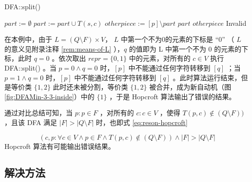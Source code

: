 \begin{algorithm}
    \caption{ DFA::split() }\label{al:split}
    \begin{algorithmic}[1]
         
            \Statex {}
            \State $part := \emptyset$ 
             
                    \State $part := part \cup T(s,c)$
                \EndIf
            \EndFor
                \State $otherpiece := [p] \setminus part$
                     {$part$}
                \Else
                     {$otherpiece$}
                \EndIf
            \Else
                 {Invalid}
            \EndIf
        \EndFunction
    \end{algorithmic}
\end{algorithm}

在本例中，由于 $L=(Q \setminus F) \times V$， $L$ 中第一个不为0的元素的下标是 “0” （ $L$ 的意义见附录注释 \ref{rem:means-of-L} ），$q$ 的值即为 L 中第一个不为 0 的元素的下标，此时 $q = 0$ 。依次取出 $repr = \{ 0,1 \}$ 中的元素，对所有的 $c \in V$ 执行 DFA::split() 。当 $p=0 \land q=0 $ 时，$[p]$ 中不能通过任何字符转移到 $[q]$ ；当 $p=1 \land q=0 $ 时，$[p]$ 中不能通过任何字符转移到 $[q]$ 。此时算法运行结束，但是等价类 $\{1,2 \}$ 此时还未被分割，等价类 $\{1,2 \}$ 被合并，成为新自动机（图 \ref{fig:DFAMin-3-3-inside}）中的 $\{ 1\}$ ，于是 Hopcroft 算法输出了错误的结果。

通过对比总结可知，当 $p:p \in F$ ，对所有的 $c:c\in V$ ，使得 $ T(p,c) \notin (Q\setminus F) ) $，且该 DFA 满足 $|F| > |Q \setminus F| $ 时，也即式 \ref{eq:reson-hopcroft}

\begin{equation}\label{eq:reson-hopcroft} 
    (c,p: \forall c \in V \land p \in F \land T(p,c) \notin (Q\setminus F) ) \land |F| > |Q \setminus F| 
\end{equation}
Hopcroft 算法有可能输出错误结果。

\newpage
\subsection{解决方法}\label{subsec:solve-hopcroft}


